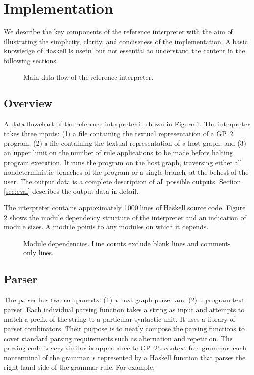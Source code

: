 \section{Implementation}
\label{sec:implementation}
We describe the key components of the reference interpreter with the aim of illustrating the simplicity, clarity, and conciseness of the implementation. A basic knowledge of Haskell is useful but not essential to understand the content in the following sections. 

\begin{figure}
\centering

\caption{Main data flow of the reference interpreter.} \label{fig:architecture}
\end{figure}

\subsection{Overview}
A data flowchart of the reference interpreter is shown in Figure \ref{fig:architecture}. The interpreter takes three inputs: (1) a file containing the textual representation of a GP~2 program, (2) a file containing the textual representation of a host graph, and (3) an upper limit on the number of rule applications to be made before halting program execution. It runs the program on the host graph, traversing either all nondeterministic branches of the program or a single branch, at the behest of the user. The output data is a complete description of all possible outputs. Section \ref{sec:eval} describes the output data in detail.

The interpreter contains approximately 1000 lines of Haskell source code. Figure \ref{fig:modules} shows the module dependency structure of the interpreter and an indication of module sizes. A module points to any modules on which it depends. 

\begin{figure}
\centering

\caption{Module dependencies. Line counts exclude blank lines and comment-only lines.} \label{fig:modules}
\end{figure}

\subsection{Parser}
The parser has two components: (1) a host graph parser and (2) a program text parser. Each individual parsing function takes a string as input and attempts to match a prefix of the string to a particular syntactic unit. It uses a library of parser combinators. Their purpose is to neatly compose the parsing functions to cover standard parsing requirements such as alternation and repetition. The parsing code is very similar in appearance to GP~2's context-free grammar: each nonterminal of the grammar is represented by a Haskell function that parses the right-hand side of the grammar rule. For example:

